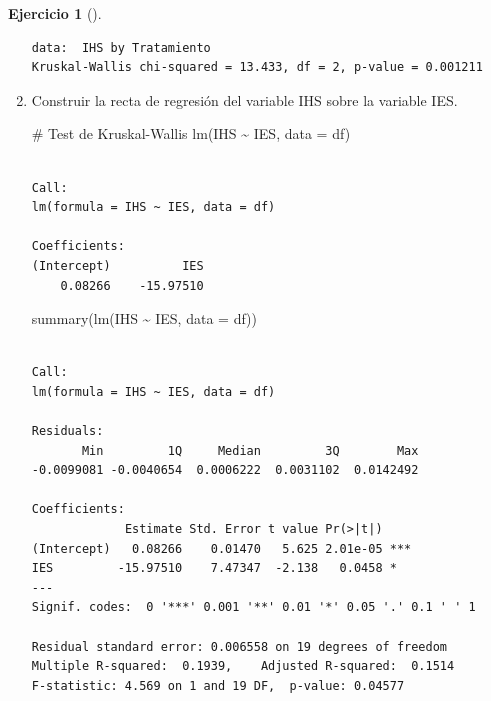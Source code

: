 \documentclass[
  a4paper,
]{scrreport}
\newenvironment{Shaded}{\begin{snugshade}}{\end{snugshade}}
\newcommand{\AttributeTok}[1]{\textcolor[rgb]{0.40,0.45,0.13}{#1}}
\newcommand{\CommentTok}[1]{\textcolor[rgb]{0.37,0.37,0.37}{#1}}
\newcommand{\FunctionTok}[1]{\textcolor[rgb]{0.28,0.35,0.67}{#1}}
\newcommand{\NormalTok}[1]{\textcolor[rgb]{0.00,0.23,0.31}{#1}}
\newcommand{\SpecialCharTok}[1]{\textcolor[rgb]{0.37,0.37,0.37}{#1}}
\theoremstyle{definition}
\newtheorem{exercise}{Ejercicio}[chapter]
\theoremstyle{definition}
\theoremstyle{remark}
\begin{document}
\begin{exercise}[]
\begin{enumerate}
\begin{tcolorbox}
\begin{verbatim}
data:  IHS by Tratamiento
Kruskal-Wallis chi-squared = 13.433, df = 2, p-value = 0.001211
\end{verbatim}

  \end{tcolorbox}
\item
  Construir la recta de regresión del variable IHS sobre la variable
  IES.

  \begin{tcolorbox}[enhanced jigsaw, title=\textcolor{quarto-callout-note-color}{\faInfo}\hspace{0.5em}{Solución}, titlerule=0mm, toprule=.15mm, colbacktitle=quarto-callout-note-color!10!white, arc=.35mm, colframe=quarto-callout-note-color-frame, opacitybacktitle=0.6, coltitle=black, left=2mm, colback=white, opacityback=0, breakable, bottomrule=.15mm, toptitle=1mm, leftrule=.75mm, bottomtitle=1mm, rightrule=.15mm]

\begin{Shaded}
\begin{Highlighting}[]
\CommentTok{\# Test de Kruskal{-}Wallis}
\FunctionTok{lm}\NormalTok{(IHS }\SpecialCharTok{\textasciitilde{}}\NormalTok{ IES, }\AttributeTok{data =}\NormalTok{ df)}
\end{Highlighting}
\end{Shaded}

\begin{verbatim}

Call:
lm(formula = IHS ~ IES, data = df)

Coefficients:
(Intercept)          IES  
    0.08266    -15.97510  
\end{verbatim}

\begin{Shaded}
\begin{Highlighting}[]
\FunctionTok{summary}\NormalTok{(}\FunctionTok{lm}\NormalTok{(IHS }\SpecialCharTok{\textasciitilde{}}\NormalTok{ IES, }\AttributeTok{data =}\NormalTok{ df))}
\end{Highlighting}
\end{Shaded}

\begin{verbatim}

Call:
lm(formula = IHS ~ IES, data = df)

Residuals:
       Min         1Q     Median         3Q        Max 
-0.0099081 -0.0040654  0.0006222  0.0031102  0.0142492 

Coefficients:
             Estimate Std. Error t value Pr(>|t|)    
(Intercept)   0.08266    0.01470   5.625 2.01e-05 ***
IES         -15.97510    7.47347  -2.138   0.0458 *  
---
Signif. codes:  0 '***' 0.001 '**' 0.01 '*' 0.05 '.' 0.1 ' ' 1

Residual standard error: 0.006558 on 19 degrees of freedom
Multiple R-squared:  0.1939,    Adjusted R-squared:  0.1514 
F-statistic: 4.569 on 1 and 19 DF,  p-value: 0.04577
\end{verbatim}

  \end{tcolorbox}
\end{enumerate}

\end{exercise}
\end{document}
